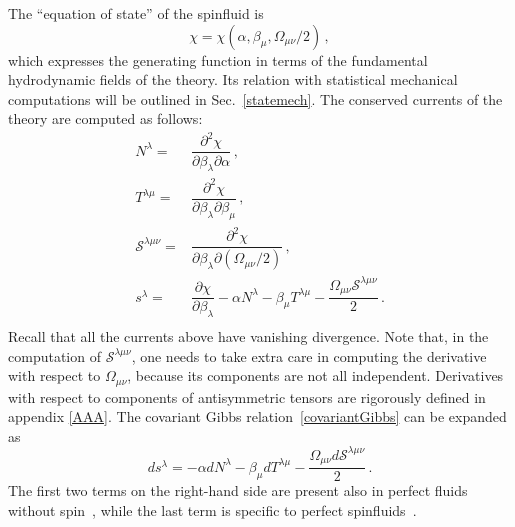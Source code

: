 \documentclass[12pt,aps,prd,nofootinbib,noshowkeys,noshowpacs,longbibliography,
superscriptaddress,tightenlines,floatfix,preprintnumbers]{revtex4-2}
\begin{document}
The ``equation of state'' of the spinfluid is
\begin{equation}
   \chi=\chi(\alpha,\beta_\mu,\Omega_{\mu \nu}/2) \, ,
\end{equation}
which expresses the generating function in terms of the fundamental hydrodynamic fields of the theory. Its relation with statistical mechanical computations will be outlined in Sec.~\ref{statemech}. The conserved currents of the theory are computed as follows:
\begin{equation}\label{agmuni}
    \begin{split}
        N^\lambda ={}& \dfrac{\partial^2 \chi}{\partial \beta_\lambda \partial \alpha} \, , \\
        T^{\lambda \mu} ={}& \dfrac{\partial^2 \chi}{\partial \beta_\lambda \partial \beta_\mu} \, , \\
        \mathcal{S}^{\lambda \mu \nu}={}& \dfrac{\partial^2 \chi}{\partial \beta_\lambda \partial (\Omega_{\mu \nu}/2)} \, , \\
        s^\lambda ={}& \dfrac{\partial \chi}{\partial \beta_\lambda} -\alpha N^\lambda -\beta_\mu T^{\lambda \mu} -\dfrac{\Omega_{\mu \nu}\mathcal{S}^{\lambda \mu \nu}}{2} \, . \\
    \end{split}
\end{equation}
Recall that all the currents above have vanishing divergence.
Note that, in the computation of $\mathcal{S}^{\lambda \mu \nu}$, one needs to take extra care in computing the derivative with respect to $\Omega_{\mu \nu}$, because its components are not all independent. Derivatives with respect to  components of antisymmetric tensors are rigorously defined in appendix \ref{AAA}. The covariant Gibbs relation~\eqref{covariantGibbs} can be expanded as
\begin{equation}\label{covGibbsFinal}
    ds^\lambda =-\alpha dN^\lambda -\beta_\mu dT^{\lambda \mu} - \dfrac{\Omega_{\mu \nu} d\mathcal{S}^{\lambda \mu \nu}}{2} \, .
\end{equation}
The first two terms on the right-hand side are present also in perfect fluids without spin~\cite{Israel_Stewart_1979}, while the last term is specific to perfect spinfluids~\cite{Florkowski:2017ruc,Hattori:2019lfp,Hongo:2021ona,Becattini:2023ouz,Becattini:2025oyi}. 
\end{document}
